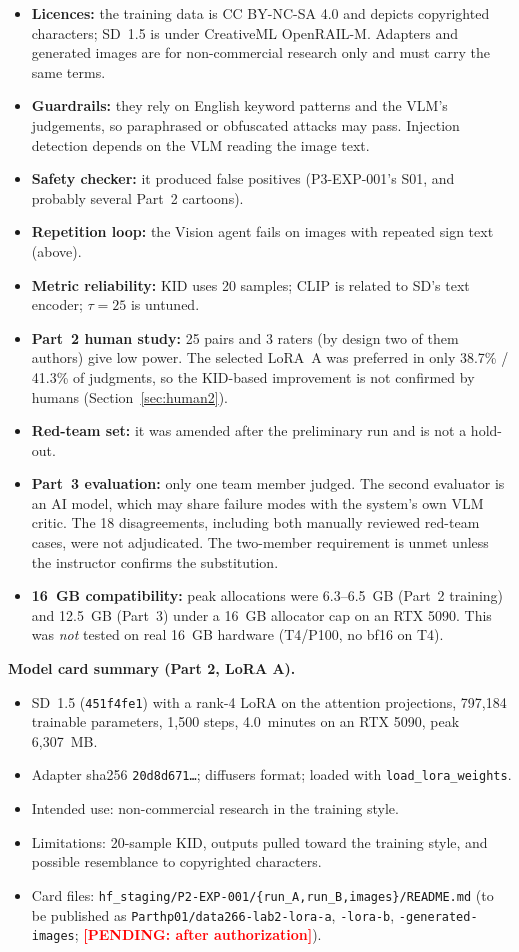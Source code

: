 \documentclass[conference]{IEEEtran}
\newcommand{\pending}[1]{\textcolor{red}{\textbf{[PENDING: #1]}}}
\begin{document}
\begin{itemize}
\item \textbf{Licences:} the training data is CC BY-NC-SA 4.0 and depicts copyrighted characters; SD~1.5 is under CreativeML OpenRAIL-M. Adapters and generated images are for non-commercial research only and must carry the same terms.
\item \textbf{Guardrails:} they rely on English keyword patterns and the VLM's judgements, so paraphrased or obfuscated attacks may pass. Injection detection depends on the VLM reading the image text.
\item \textbf{Safety checker:} it produced false positives (P3-EXP-001's S01, and probably several Part~2 cartoons).
\item \textbf{Repetition loop:} the Vision agent fails on images with repeated sign text (above).
\item \textbf{Metric reliability:} KID uses 20 samples; CLIP is related to SD's text encoder; $\tau{=}25$ is untuned.
\item \textbf{Part~2 human study:} 25 pairs and 3 raters (by design two of them authors) give low power. The selected LoRA~A was preferred in only 38.7\% / 41.3\% of judgments, so the KID-based improvement is not confirmed by humans (Section~\ref{sec:human2}).
\item \textbf{Red-team set:} it was amended after the preliminary run and is not a hold-out.
\item \textbf{Part~3 evaluation:} only one team member judged. The second evaluator is an AI model, which may share failure modes with the system's own VLM critic. The 18 disagreements, including both manually reviewed red-team cases, were not adjudicated. The two-member requirement is unmet unless the instructor confirms the substitution.
\item \textbf{16~GB compatibility:} peak allocations were 6.3--6.5~GB (Part~2 training) and 12.5~GB (Part~3) under a 16~GB allocator cap on an RTX 5090. This was \emph{not} tested on real 16~GB hardware (T4/P100, no bf16 on T4).
\end{itemize}

\textbf{Model card summary (Part 2, LoRA A).}
\begin{itemize}
\item SD~1.5 (\texttt{451f4fe1}) with a rank-4 LoRA on the attention projections, 797{,}184 trainable parameters, 1{,}500 steps, 4.0~minutes on an RTX 5090, peak 6{,}307~MB.
\item Adapter sha256 \texttt{20d8d671\ldots}; diffusers format; loaded with \texttt{load\_lora\_weights}.
\item Intended use: non-commercial research in the training style.
\item Limitations: 20-sample KID, outputs pulled toward the training style, and possible resemblance to copyrighted characters.
\item Card files: \texttt{hf\_staging/P2-EXP-001/\{run\_A,run\_B,images\}/README.md} (to be published as \texttt{Parthp01/data266-lab2-lora-a}, \texttt{-lora-b}, \texttt{-generated-images}; \pending{after authorization}).
\end{itemize}
\end{document}

